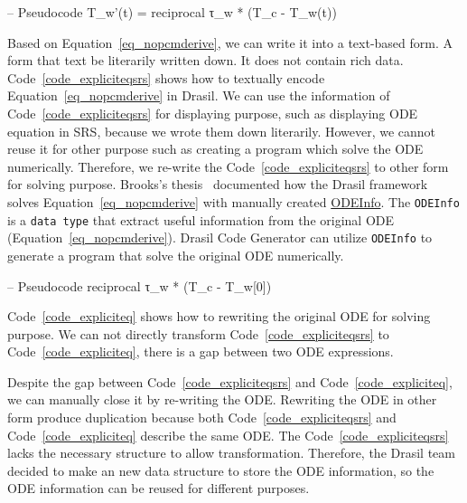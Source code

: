 \begin{listing}[ht]
\begin{haskell1}
-- Pseudocode
T_w'(t) = reciprocal τ_w * (T_c - T_w(t))
\end{haskell1}
\label{code_expliciteqsrs}
\end{listing}

Based on Equation~\ref{eq_nopcmderive}, we can write it into a text-based form. A form that text be literarily written down. It does not contain rich data. Code~\ref{code_expliciteqsrs} shows how to textually encode Equation~\ref{eq_nopcmderive} in Drasil. We can use the information of Code~\ref{code_expliciteqsrs} for displaying purpose, such as displaying ODE equation in SRS, because we wrote them down literarily. However, we cannot reuse it for other purpose such as creating a program which solve the ODE numerically. Therefore, we re-write the Code~\ref{code_expliciteqsrs} to other form for solving purpose. Brooks's thesis~\citep{brooks} documented how the Drasil framework solves Equation~\ref{eq_nopcmderive} with manually created \href{https://jacquescarette.github.io/Drasil/docs/drasil-code-0.1.9.0/Language-Drasil-Code.html#t:ODEInfo}{ODEInfo}. The \verb|ODEInfo| is a \verb|data type| that extract useful information from the original ODE (Equation~\ref{eq_nopcmderive}). Drasil Code Generator can utilize \verb|ODEInfo| to generate a program that solve the original ODE numerically. 
\begin{listing}[ht]
\begin{haskell1}
-- Pseudocode
reciprocal τ_w * (T_c - T_w[0])
\end{haskell1}
\label{code_expliciteq}
\end{listing}
Code~\ref{code_expliciteq} shows how to rewriting the original ODE for solving purpose. We can not directly transform Code~\ref{code_expliciteqsrs} to Code~\ref{code_expliciteq}, there is a gap between two ODE expressions.

Despite the gap between Code~\ref{code_expliciteqsrs} and Code~\ref{code_expliciteq}, we can manually close it by re-writing the ODE. Rewriting the ODE in other form produce duplication because both Code~\ref{code_expliciteqsrs} and Code~\ref{code_expliciteq} describe the same ODE. The Code~\ref{code_expliciteqsrs} lacks the necessary structure to allow transformation. Therefore, the Drasil team decided to make an new data structure to store the ODE information, so the ODE information can be reused for different purposes.

